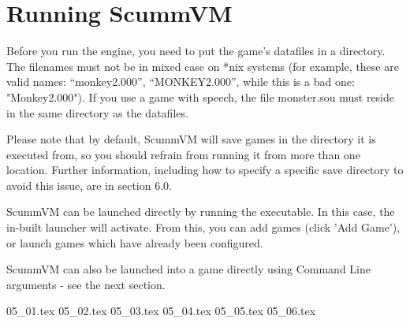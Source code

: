 


\section{Running ScummVM}

Before you run the engine, you need to put the game's datafiles in a
directory. The filenames must not be in mixed case on *nix systems
(for example, these are valid names: ``monkey2.000'', ``MONKEY2.000'', while
this is a bad one: "Monkey2.000"). If you use a game with speech, the file
monster.sou must reside in the same directory as the datafiles.

Please note that by default, ScummVM will save games in the directory
it is executed from, so you should refrain from running it from more than
one location. Further information, including how to specify a specific save
directory to avoid this issue, are in section 6.0.

ScummVM can be launched directly by running the executable. In this case,
the in-built launcher will activate. From this, you can add games (click
'Add Game'), or launch games which have already been configured.

ScummVM can also be launched into a game directly using Command Line
arguments - see the next section.

 {05_01.tex}
 {05_02.tex}
 {05_03.tex}
 {05_04.tex}
 {05_05.tex}
 {05_06.tex}